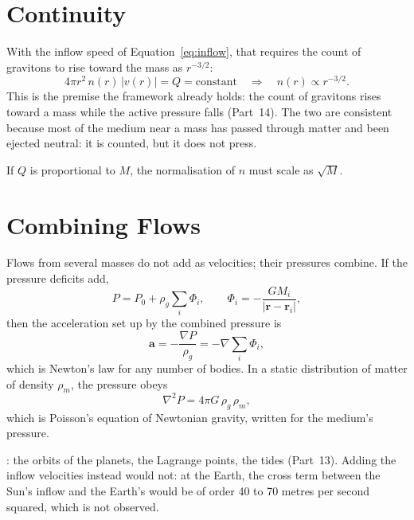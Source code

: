 \documentclass[11pt,a4paper]{article}
\begin{document}
\section{Continuity}
\label{sec:continuity}

 With the inflow speed of Equation~\eqref{eq:inflow}, that requires the count of gravitons to rise toward the mass as $r^{-3/2}$:
\begin{equation}
4\pi r^2\, n(r)\, |v(r)| = Q = \text{constant} \quad\Longrightarrow\quad n(r) \propto r^{-3/2}.
\label{eq:continuity}
\end{equation}
This is the premise the framework already holds: the count of gravitons rises toward a mass while the active pressure falls (Part~14). The two are consistent because most of the medium near a mass has passed through matter and been ejected neutral: it is counted, but it does not press.

 If $Q$ is proportional to $M$, the normalisation of $n$ must scale as $\sqrt{M}$.

\section{Combining Flows}
\label{sec:combining}

\begin{hypbar}
Flows from several masses do not add as velocities; their pressures combine. If the pressure deficits add,
\begin{equation}
P = P_0 + \rho_g \sum_i \Phi_i, \qquad \Phi_i = -\frac{GM_i}{|\mathbf{r}-\mathbf{r}_i|},
\end{equation}
then the acceleration set up by the combined pressure is
\begin{equation}
\mathbf{a} = -\frac{\nabla P}{\rho_g} = -\nabla\sum_i \Phi_i,
\end{equation}
which is Newton's law for any number of bodies. In a static distribution of matter of density $\rho_m$, the pressure obeys
\begin{equation}
\nabla^2 P = 4\pi G\,\rho_g\,\rho_m,
\label{eq:poisson}
\end{equation}
which is Poisson's equation of Newtonian gravity, written for the medium's pressure.
\end{hypbar}

: the orbits of the planets, the Lagrange points, the tides (Part~13). Adding the inflow velocities instead would not: at the Earth, the cross term between the Sun's inflow and the Earth's would be of order 40 to 70 metres per second squared, which is not observed. 
\end{document}
